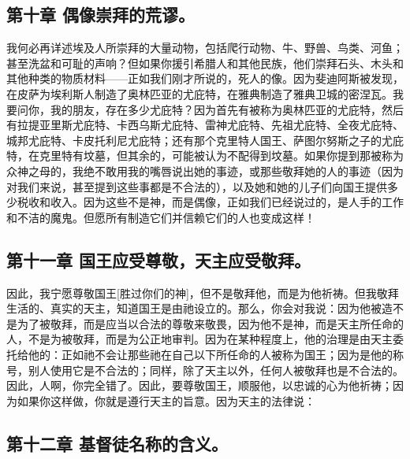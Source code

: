 
\subsection{第十章 偶像崇拜的荒谬。}

我何必再详述埃及人所崇拜的大量动物，包括爬行动物、牛、野兽、鸟类、河鱼；甚至洗盆和可耻的声响？但如果你援引希腊人和其他民族，他们崇拜石头、木头和其他种类的物质材料——正如我们刚才所说的，死人的像。因为斐迪阿斯被发现，在皮萨为埃利斯人制造了奥林匹亚的尤庇特，在雅典制造了雅典卫城的密涅瓦。我要问你，我的朋友，存在多少尤庇特？因为首先有被称为奥林匹亚的尤庇特，然后有拉提亚里斯尤庇特、卡西乌斯尤庇特、雷神尤庇特、先祖尤庇特、全夜尤庇特、城邦尤庇特、卡皮托利尼尤庇特；还有那个克里特人国王、萨图尔努斯之子的尤庇特，在克里特有坟墓，但其余的，可能被认为不配得到坟墓。如果你提到那被称为众神之母的，我绝不敢用我的嘴唇说出她的事迹，或那些敬拜她的人的事迹（因为对我们来说，甚至提到这些事都是不合法的），以及她和她的儿子们向国王提供多少税收和收入。因为这些不是神，而是偶像，正如我们已经说过的，是人手的工作和不洁的魔鬼。但愿所有制造它们并信赖它们的人也变成这样！\par


\subsection{第十一章 国王应受尊敬，天主应受敬拜。}

因此，我宁愿尊敬国王[胜过你们的神]，但不是敬拜他，而是为他祈祷。但我敬拜生活的、真实的天主，知道国王是由祂设立的。那么，你会对我说：因为他被造不是为了被敬拜，而是应当以合法的尊敬来敬畏，因为他不是神，而是天主所任命的人，不是为被敬拜，而是为公正地审判。因为在某种程度上，他的治理是由天主委托给他的：正如祂不会让那些祂在自己以下所任命的人被称为国王；因为是他的称号，别人使用它是不合法的；同样，除了天主以外，任何人被敬拜也是不合法的。因此，人啊，你完全错了。因此，要尊敬国王，顺服他，以忠诚的心为他祈祷；因为如果你这样做，你就是遵行天主的旨意。因为天主的法律说：\par


\subsection{第十二章 基督徒名称的含义。}

